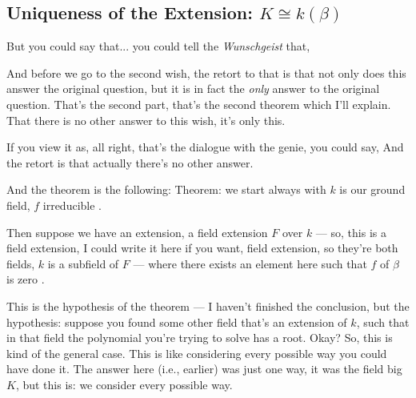 \subsection{Uniqueness of the Extension: \texorpdfstring{$K \cong k(\beta)$}{K iso k(beta)}}

\begin{speech}[01:18:26 - 01:19:02]
But you could say that... you could tell the \emph{Wunschgeist} that, 

And before we go to the second wish, the retort to that is that not only does this answer the original question, but it is in fact the \emph{only} answer to the original question. That's the second part, that's the second theorem which I'll explain. That there is no other answer to this wish, it's only this.
\end{speech}

\begin{hidden}
\end{hidden}

\begin{speech}[01:19:37 - 01:21:05]
If you view it as, all right, that's the dialogue with the genie, you could say,  And the retort is that actually there's no other answer.

And the theorem is the following: Theorem: we start always with $k$ is our ground field, $f$ irreducible .

Then suppose we have an extension, a field extension $F$ over $k$ --- so, this is a field extension, I could write it here if you want, field extension, so they're both fields, $k$ is a subfield of $F$ --- where there exists an element here such that $f$ of $\beta$ is zero .

This is the hypothesis of the theorem --- I haven't finished the conclusion, but the hypothesis: suppose you found some other field that's an extension of $k$, such that in that field the polynomial you're trying to solve has a root. Okay? So, this is kind of the general case. This is like considering every possible way you could have done it. The answer here (i.e., earlier) was just one way, it was the field big $K$, but this is: we consider every possible way.
\end{speech}

